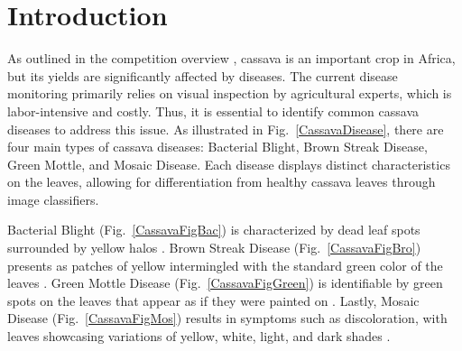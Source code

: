 \section{Introduction}

As outlined in the competition overview \cite{cassava-leaf-disease-classification}, cassava is an important crop in Africa, but its yields are significantly affected by diseases. The current disease monitoring primarily relies on visual inspection by agricultural experts, which is labor-intensive and costly. Thus, it is essential to identify common cassava diseases to address this issue. As illustrated in Fig.~\ref{CassavaDisease}, there are four main types of cassava diseases: Bacterial Blight, Brown Streak Disease, Green Mottle, and Mosaic Disease. Each disease displays distinct characteristics on the leaves, allowing for differentiation from healthy cassava leaves through image classifiers.

Bacterial Blight (Fig.~\ref{CassavaFigBac}) is characterized by dead leaf spots surrounded by yellow halos \cite{uwm2024BacterialBlight}. Brown Streak Disease (Fig.~\ref{CassavaFigBro}) presents as patches of yellow intermingled with the standard green color of the leaves \cite{patil2015cassava}. Green Mottle Disease (Fig.~\ref{CassavaFigGreen}) is identifiable by green spots on the leaves that appear as if they were painted on \cite{robson2024cassava}. Lastly, Mosaic Disease (Fig.~\ref{CassavaFigMos}) results in symptoms such as discoloration, with leaves showcasing variations of yellow, white, light, and dark shades \cite{chikoti2019cassava}.

